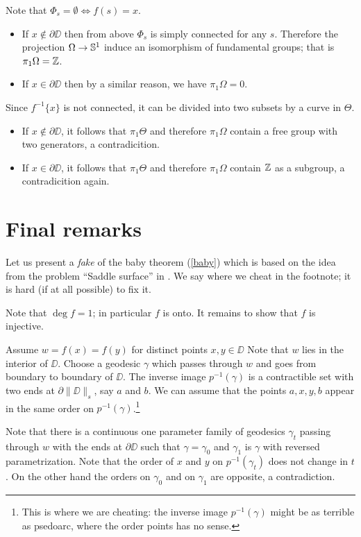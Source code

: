 \documentclass{article}
\begin{document}
Note that $\Phi_s=\emptyset\iff f(s)=x$.
\begin{itemize}
\item If $x\notin\partial\DD$ then from above $\Phi_s$ is simply connected for any $s$.
Therefore the projection $\Omega\to \mathbb{S}^1$ induce an isomorphism of fundamental groups; that is $\pi_1\Omega=\mathbb{Z}$.
\item If $x\in\partial\DD$ then by a similar reason, we have $\pi_1\Omega=0$.
\end{itemize}



Since $f^{-1}\{x\}$ is not connected, it can be divided into two subsets by a curve in $\Theta$.
\begin{itemize}
\item If $x\notin\partial \DD$, it follows that $\pi_1\Theta$ and therefore $\pi_1\Omega$ contain a free group with two generators, a contradicition.
\item If $x\in\partial\DD$, it follows that $\pi_1\Theta$ and therefore $\pi_1\Omega$ contain $\mathbb{Z}$ as a subgroup, a contradicition again.\qeds
\end{itemize}


\section{Final remarks}

Let us present a \emph{fake} of the baby theorem (\ref{baby}) which is based on the idea from the problem ``Saddle surface'' in \cite{petrunin-orthodox}.
We say where we cheat in the footnote; 
it is hard (if at all possible) to fix it.

Note that  $\deg f=1$;
in particular $f$ is onto.
It remains to show that $f$ is injective.

Assume  $w=f(x)=f(y)$ for distinct points $x,y\in\DD$
Note that  $w$ lies in the interior of $\DD$.
Choose a geodesic $\gamma$ which passes through $w$ and goes 
from boundary to boundary of $\DD$.
The inverse image $p^{-1}(\gamma)$ is a contractible set with two ends at $\partial\|\DD\|_s$, say $a$ and $b$.
We can assume that the points $a,x,y,b$ appear in the same order on $p^{-1}(\gamma)$.\footnote{This is where we are cheating: the inverse image $p^{-1}(\gamma)$ might be as terrible as psedoarc, where the order points has no sense.}

Note that there is a continuous one parameter family of geodesics $\gamma_t$ passing through $w$ with the ends at $\partial \DD$
such that $\gamma=\gamma_0$ and $\gamma_1$ is $\gamma$ with reversed parametrization.
Note that the order of $x$ and $y$ on $p^{-1}(\gamma_t)$ does not change in $t$.
On the other hand the orders on $\gamma_0$ and on $\gamma_1$ are opposite, a contradiction.\qeds
\end{document}
